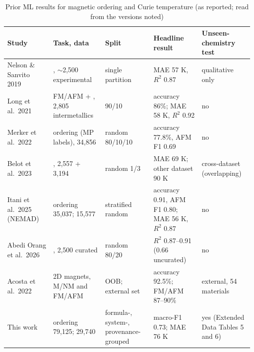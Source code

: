 \documentclass[11pt,a4paper]{article}
\begin{document}
\begin{table}
\caption{Prior ML results for magnetic ordering and Curie temperature (as reported; read from the versions noted)}
\label{tab:tableS9_prior_results}
\tablefont
\begin{tabularx}{\textwidth}{@{}>{\raggedright\arraybackslash}X>{\raggedright\arraybackslash}Xl>{\raggedright\arraybackslash}X>{\raggedright\arraybackslash}X@{}}
\toprule
\textbf{Study} & \textbf{Task, data} & \textbf{Split} & \textbf{Headline result} & \textbf{Unseen-chemistry test} \\
\midrule
Nelson \& Sanvito 2019~\cite{nelson2019curie} & \Tc{}, $\sim$2,500 experimental & single partition & MAE 57 K, $R^2$ 0.87 & qualitative only \\
Long et al.\ 2021~\cite{long2021ferro} & FM/AFM + \Tc{}, 2,805 intermetallics & 90/10 & accuracy 86\%; \Tc{} MAE 58 K, $R^2$ 0.92 & no \\
Merker et al.\ 2022~\cite{merker2022classifiers} & ordering (MP labels), 34,856 & random 80/10/10 & accuracy 77.8\%, AFM F1 0.69 & no \\
Belot et al.\ 2023~\cite{belot2023curie} & \Tc{}, 2,557 + 3,194 & random 1/3 & MAE 69 K; other dataset 90 K & cross-dataset (overlapping) \\
Itani et al.\ 2025 (NEMAD)~\cite{itani2025nemad} & ordering 35,037; \Tc{} 15,577 & stratified random & accuracy 0.91, AFM F1 0.80; MAE 56 K, $R^2$ 0.87 & no \\
Abedi Orang et al.\ 2026~\cite{abediorang2026curie} & \Tc{}, 2,500 curated & random 80/20 & $R^2$ 0.87--0.91 (0.66 uncurated) & no \\
Acosta et al.\ 2022~\cite{acosta2022ordering2d} & 2D magnets, M/NM and FM/AFM & OOB; external set & accuracy 92.5\%; FM/AFM 87--90\% & external, 54 materials \\
This work & ordering 79,125; \Tc{} 29,740 & formula-, system-, provenance-grouped & macro-F1 0.73; \Tc{} MAE 76 K & yes (Extended Data Tables 5 and 6) \\
\bottomrule
\end{tabularx}
\par\vspace{4pt}
\end{table}
\end{document}
